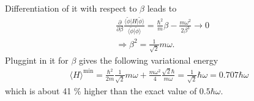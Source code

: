 \documentclass{jlreq}
\begin{document}
Differentiation of it with respect to $\beta$ leads to
\begin{align}
    &\frac{\partial}{\partial\beta}\frac{\langle\tilde{\phi}|H|\tilde{\phi}\rangle}{\langle\tilde{\phi}|\tilde{\phi}\rangle}=\frac{\hbar^2}{m}\beta-\frac{m\omega^2}{2\beta^3}\rightarrow 0 \\
    &\Rightarrow \beta^2=\frac{1}{\sqrt{2}}m\omega.
\end{align}
Pluggint in it for $\beta$ gives the following variational energy
\begin{align}
    \langle H\rangle^\text{min}=\frac{\hbar^2}{2m}\frac{1}{\sqrt{2}}m\omega+\frac{m\omega^2}{4} \frac{\sqrt{2}\hbar}{m\omega}=\frac{1}{\sqrt{2}}\hbar\omega=0.707\hbar\omega
\end{align}
which is about 41 \% higher than the exact value of $0.5\hbar\omega$.
\end{document}
